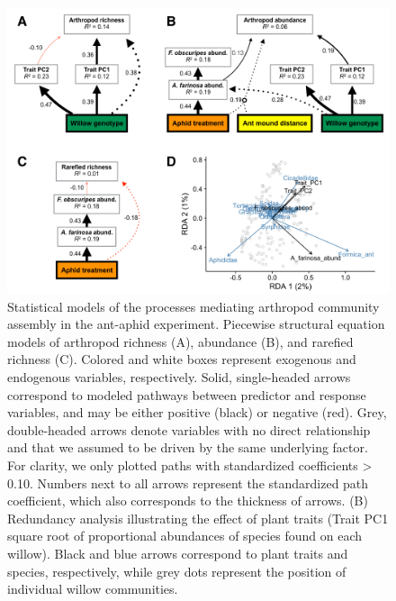 \documentclass[11pt]{article}
\begin{document}
\begin{figure}[h!]
\centering
\includegraphics[scale = 0.4]{image04.png}
\caption{Statistical models of the processes mediating
arthropod community assembly in the ant-aphid experiment. Piecewise
structural equation models of arthropod richness (A), abundance (B), and
rarefied richness (C). Colored and white boxes represent exogenous and
endogenous variables, respectively. Solid, single-headed arrows
correspond to modeled pathways between predictor and response variables,
and may be either positive (black) or negative (red). Grey,
double-headed arrows denote variables with no direct relationship and
that we assumed to be driven by the same underlying factor. For clarity,
we only plotted paths with standardized coefficients \textgreater{}
0.10. Numbers next to all arrows represent the standardized path
coefficient, which also corresponds to the thickness of arrows. (B)
Redundancy analysis illustrating the effect of plant traits (Trait PC1
square root of proportional abundances of species found on each willow).
Black and blue arrows correspond to plant traits and species,
respectively, while grey dots represent the position of individual
willow communities.}
\label{Fig:SEMaa}
\end{figure}
\end{document}
